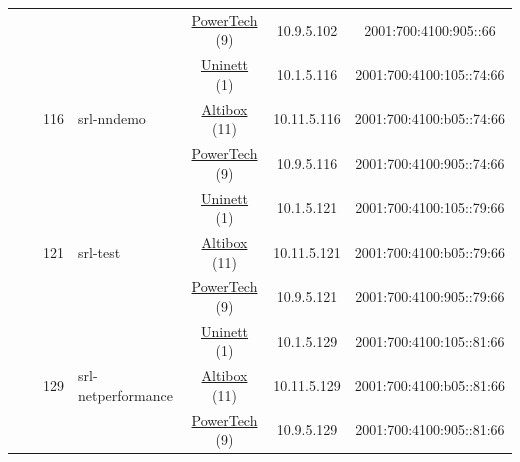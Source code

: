 \begin{small}
\begin{center}
\begin{longtable}{|c|c|c|c|c|c|c|c|}
  &  & \multicolumn{2}{|c|}{} & \multicolumn{2}{|c|}{\tiny{\href{http://www.powertech.no}{PowerTech} (9)}} & \tiny{10.9.5.102} & \tiny{2001:700:4100:905::66} \\* \cline{3-3}\cline{4-4}\cline{5-5}\cline{6-6}\cline{7-7}\cline{8-8}
  &  & \multirow{3}{*}{\tiny{116}} & \multicolumn{1}{|l|}{\multirow{3}{*}{\tiny{srl-nndemo}}} & \multicolumn{2}{|c|}{\tiny{\href{https://www.uninett.no}{Uninett} (1)}} & \tiny{10.1.5.116} & \tiny{2001:700:4100:105::74:66} \\* \cline{5-5}\cline{6-6}\cline{7-7}\cline{8-8}
  &  &  &  & \multicolumn{2}{|c|}{\tiny{\href{https://www.altibox.no}{Altibox} (11)}} & \tiny{10.11.5.116} & \tiny{2001:700:4100:b05::74:66} \\* \cline{5-5}\cline{6-6}\cline{7-7}\cline{8-8}
  &  &  &  & \multicolumn{2}{|c|}{\tiny{\href{http://www.powertech.no}{PowerTech} (9)}} & \tiny{10.9.5.116} & \tiny{2001:700:4100:905::74:66} \\* \cline{3-3}\cline{4-4}\cline{5-5}\cline{6-6}\cline{7-7}\cline{8-8}
  &  & \multirow{3}{*}{\tiny{121}} & \multicolumn{1}{|l|}{\multirow{3}{*}{\tiny{srl-test}}} & \multicolumn{2}{|c|}{\tiny{\href{https://www.uninett.no}{Uninett} (1)}} & \tiny{10.1.5.121} & \tiny{2001:700:4100:105::79:66} \\* \cline{5-5}\cline{6-6}\cline{7-7}\cline{8-8}
  &  &  &  & \multicolumn{2}{|c|}{\tiny{\href{https://www.altibox.no}{Altibox} (11)}} & \tiny{10.11.5.121} & \tiny{2001:700:4100:b05::79:66} \\* \cline{5-5}\cline{6-6}\cline{7-7}\cline{8-8}
  &  &  &  & \multicolumn{2}{|c|}{\tiny{\href{http://www.powertech.no}{PowerTech} (9)}} & \tiny{10.9.5.121} & \tiny{2001:700:4100:905::79:66} \\* \cline{3-3}\cline{4-4}\cline{5-5}\cline{6-6}\cline{7-7}\cline{8-8}
  &  & \multirow{3}{*}{\tiny{129}} & \multicolumn{1}{|l|}{\multirow{3}{*}{\tiny{srl-netperformance}}} & \multicolumn{2}{|c|}{\tiny{\href{https://www.uninett.no}{Uninett} (1)}} & \tiny{10.1.5.129} & \tiny{2001:700:4100:105::81:66} \\* \cline{5-5}\cline{6-6}\cline{7-7}\cline{8-8}
  &  &  &  & \multicolumn{2}{|c|}{\tiny{\href{https://www.altibox.no}{Altibox} (11)}} & \tiny{10.11.5.129} & \tiny{2001:700:4100:b05::81:66} \\* \cline{5-5}\cline{6-6}\cline{7-7}\cline{8-8}
  &  &  &  & \multicolumn{2}{|c|}{\tiny{\href{http://www.powertech.no}{PowerTech} (9)}} & \tiny{10.9.5.129} & \tiny{2001:700:4100:905::81:66} \\* \cline{3-3}\cline{4-4}\cline{5-5}\cline{6-6}\cline{7-7}\cline{8-8}

\end{longtable}
\end{center}
\end{small}
